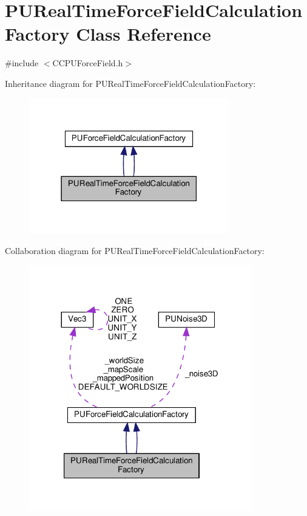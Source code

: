 \hypertarget{classPURealTimeForceFieldCalculationFactory}{}\section{P\+U\+Real\+Time\+Force\+Field\+Calculation\+Factory Class Reference}
\label{classPURealTimeForceFieldCalculationFactory}


{\ttfamily \#include $<$C\+C\+P\+U\+Force\+Field.\+h$>$}



Inheritance diagram for P\+U\+Real\+Time\+Force\+Field\+Calculation\+Factory\+:
\nopagebreak
\begin{figure}[H]
\begin{center}
\leavevmode
\includegraphics[width=247pt]{classPURealTimeForceFieldCalculationFactory__inherit__graph}
\end{center}
\end{figure}


Collaboration diagram for P\+U\+Real\+Time\+Force\+Field\+Calculation\+Factory\+:
\nopagebreak
\begin{figure}[H]
\begin{center}
\leavevmode
\includegraphics[width=275pt]{classPURealTimeForceFieldCalculationFactory__coll__graph}
\end{center}
\end{figure}
